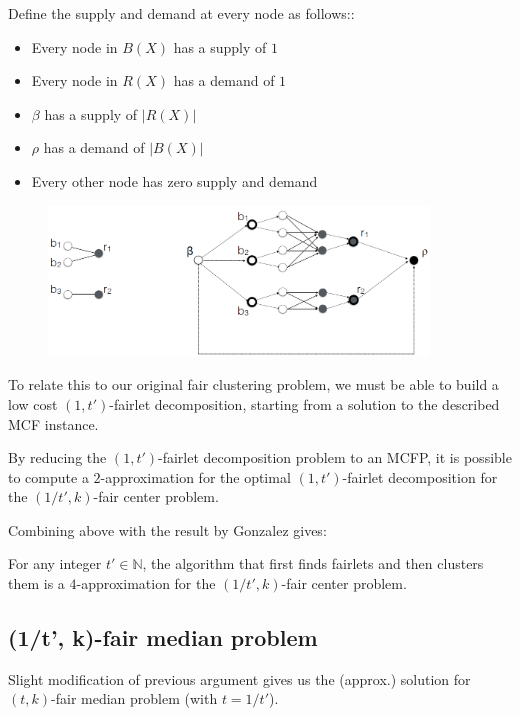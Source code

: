 Define the supply and demand at every node as follows::
\begin{itemize}
	\item Every node in $B(X)$ has a supply of $1$
	\item Every node in $R(X)$ has a demand of $1$
	\item $\beta$ has a supply of $|R(X)|$
	\item $\rho$ has a demand of $|B(X)|$
	\item Every other node has zero supply and demand
\end{itemize}

\begin{figure}[hbt]
  \includegraphics[height=4cm]{results/fig/fig3.png}
\end{figure}


To relate this to our original fair clustering problem, we must be able to build a low cost $(1, t')$-fairlet decomposition, starting from a solution to the described MCF instance.

\begin{lemma}
By reducing the $(1, t')$-fairlet decomposition problem to an MCFP, it is possible to compute a $2$-approximation for the optimal $(1, t')$-fairlet decomposition for the $(1/t', k)$-fair center problem.
\end{lemma}

Combining above with the result by Gonzalez gives:

\begin{theorem}
For any integer $t' \in \mathbb{N}$, the algorithm that first finds fairlets and then clusters them is a $4$-approximation for the $(1/t', k)$-fair center problem.

\end{theorem}


\subsection{(1/t', k)-fair median problem}

Slight modification of previous argument gives us the (approx.) solution for $(t, k)$-fair median problem (with $t = 1/t'$).

